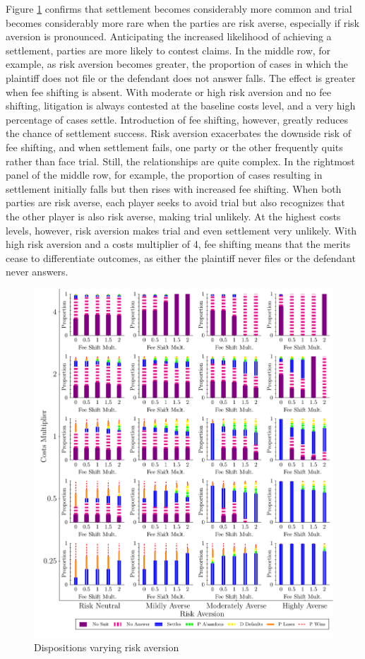 \documentclass{article}
\begin{document}
Figure \ref{fig:disposition_riskaversion} confirms that settlement becomes considerably more common and trial becomes considerably more rare when the parties are risk averse, especially if risk aversion is pronounced. Anticipating the increased likelihood of achieving a settlement, parties are more likely to contest claims. In the middle row, for example, as risk aversion becomes greater, the proportion of cases in which the plaintiff does not file or the defendant does not answer falls. The effect is greater when fee shifting is absent. With moderate or high risk aversion and no fee shifting, litigation is always contested at the baseline costs level, and a very high percentage of cases settle. Introduction of fee shifting, however, greatly reduces the chance of settlement success. Risk aversion exacerbates the downside risk of fee shifting, and when settlement fails, one party or the other frequently quits rather than face trial. Still, the relationships are quite complex. In the rightmost panel of the middle row, for example, the proportion of cases resulting in settlement initially falls but then rises with increased fee shifting. When both parties are risk averse, each player seeks to avoid trial but also recognizes that the other player is also risk averse, making trial unlikely. At the highest costs levels, however, risk aversion makes trial and even settlement very unlikely. With high risk aversion and a costs multiplier of 4, fee shifting means that the merits cease to differentiate outcomes, as either the plaintiff never files or the defendant never answers.

\begin{figure}[h!]
\centering
\includegraphics[scale=0.50, trim={0in 0in 0in 0in}, clip]{../Figures/Disposition Varying Risk Aversion.pdf}
\caption{Dispositions varying risk aversion}
\label{fig:disposition_riskaversion}
\end{figure}
\end{document}
